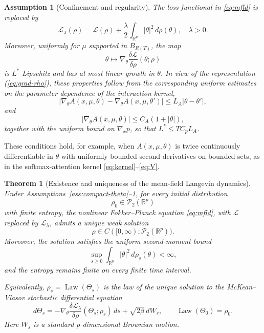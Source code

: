 \documentclass[11pt,a4wide]{article}
\newtheorem{theorem}{Theorem}[section]
\newtheorem{assumption}{Assumption}
\theoremstyle{definition}
\newcommand{\Prob}{\mathcal{P}}
\DeclareMathOperator{\Law}{Law}
\begin{document}
\begin{assumption}[Confinement and regularity]
\label{ass:confine}
The loss functional in \eqref{eq:mfld} is replaced by
\[
\mathcal L_\lambda(\rho)
=
\mathcal L(\rho)
+
\frac{\lambda}{2}
\int_{\mathbb R^p}|\theta|^2\,d\rho(\theta),
\quad \lambda>0.
\]
Moreover, uniformly for $\mu$ supported in $B_{R(T)}$, the map
\[
\theta\mapsto
\nabla_\theta
\frac{\delta\mathcal L}{\delta\rho}(\theta;\rho)
\]
is $L^*$-Lipschitz and has at most linear growth in $\theta$. In view of the representation (\ref{eq:grad-rho}), 
these properties follow from the corresponding uniform estimates on the parameter dependence of the interaction kernel,
\[
\left|
\nabla_\theta A(x,\mu,\theta)
-
\nabla_\theta A(x,\mu,\theta')
\right|
\le L_A|\theta-\theta'|,
\]
and
\[
|\nabla_\theta A(x,\mu,\theta)|
\le C_A(1+|\theta|),
\]
together with the uniform bound on $\nabla_x p$, so that $L^*\leq TC_pL_A$.  
\end{assumption}
These conditions hold, for example, when $A(x,\mu,\theta)$ is twice
continuously differentiable in $\theta$ with uniformly bounded second derivatives on bounded sets, as in the softmax-attention kernel
\eqref{eq:kernel}--\eqref{eq:V}.

\begin{theorem}[Existence and uniqueness of the mean-field Langevin dynamics]
\label{thm:mfld-wp}
Under Assumptions~\ref{ass:compact-theta}--\ref{ass:confine}, for every
initial distribution
\[
\rho_0\in\Prob_2(\mathbb R^p)
\]
with finite entropy, the nonlinear Fokker--Planck equation
\eqref{eq:mfld}, with $\mathcal L$ replaced by $\mathcal L_\lambda$, admits a
unique weak solution
\[
\rho\in C([0,\infty);\Prob_2(\mathbb R^p)).
\]
Moreover, the solution satisfies the uniform second-moment bound
\[
\sup_{s\geq 0 }
\int_{\mathbb R^p}|\theta|^2\,d\rho_s(\theta) < \infty,
\]
and the entropy remains finite on every finite time interval.

Equivalently, $\rho_s=\Law(\Theta_s)$ is the law of the unique solution to the
McKean--Vlasov stochastic differential equation
\begin{equation} 
\label{sde} 
d\Theta_s
=
-\nabla_\theta
\frac{\delta\mathcal L_\lambda}{\delta\rho}
(\Theta_s;\rho_s)\,ds
+
\sqrt{2\beta}\,dW_s,
\qquad
\Law(\Theta_0)=\rho_0 .
\end{equation} 
Here $ W_s$ is a standard $p$-dimensional Brownian motion. 
\end{theorem}
\end{document}

